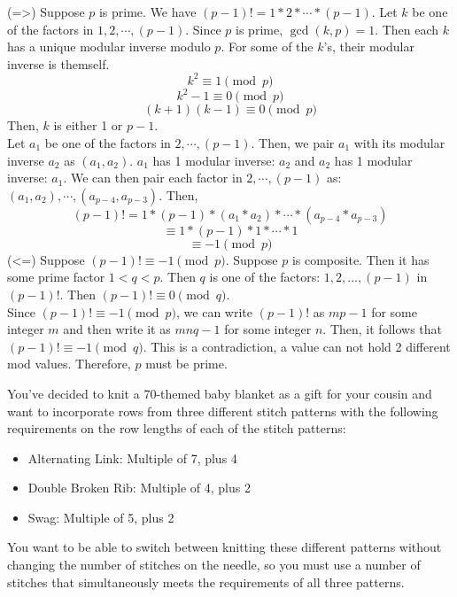 \documentclass[11pt]{article}
\begin{document}
\begin{solution}\begin{Parts}\Part 
(=>) Suppose $p$ is prime.
We have $(p-1)!=1*2*\cdots*(p-1)$.
Let $k$ be one of the factors in $1,2,\cdots,(p-1)$.
Since $p$ is prime, $\gcd(k,p)=1$.
Then each $k$ has a unique modular inverse modulo $p$.
For some of the $k$'s, their modular inverse is themself.
$$k^2\equiv1\pmod{p}$$
$$k^2-1\equiv0\pmod{p}$$
$$(k+1)(k-1)\equiv0\pmod{p}$$
Then, $k$ is either 1 or $p-1$.
\\Let $a_1$ be one of the factors in $2,\cdots,(p-1)$.
Then, we pair $a_1$ with its modular inverse $a_2$ as $(a_1,a_2)$.
$a_1$ has 1 modular inverse: $a_2$ and $a_2$ has 1 modular inverse: $a_1$.
We can then pair each factor in $2,\cdots,(p-1)$ as:
$(a_1,a_2),\cdots,(a_{p-4},a_{p-3})$.
Then, $$(p-1)!=1*(p-1)*(a_1*a_2)*\cdots*(a_{p-4}*a_{p-3})$$
$$\equiv 1*(p-1)*1*\cdots*1$$
$$\equiv-1\pmod{p}$$
\Part (<=) Suppose $(p-1)!\equiv-1\pmod{p}$.
Suppose $p$ is composite. 
Then it has some prime factor $1<q<p$.
Then $q$ is one of the factors: $1,2,\dots,(p-1)$ in $(p-1)!$.
Then $(p-1)!\equiv0\pmod{q}$.
\\Since $(p-1)!\equiv-1\pmod{p}$,
we can write $(p-1)!$ as $mp-1$ for some integer $m$
and then write it as $mnq-1$ for some integer $n$.
Then, it follows that $(p-1)!\equiv-1\pmod{q}$. 
This is a contradiction, a value can not hold 2 different mod values.
Therefore, $p$ must be prime.
\end{Parts}\end{solution}\newpage

You've decided to knit a 70-themed baby blanket as a gift for your cousin and
want to incorporate rows from three different stitch patterns with the
following requirements on the row lengths of each of the stitch patterns:
\begin{itemize}
\item Alternating Link: Multiple of 7, plus 4
\item Double Broken Rib: Multiple of 4, plus 2
\item Swag: Multiple of 5, plus 2
\end{itemize}

You want to be able to switch between knitting these different
patterns without changing the number of stitches on the needle, so you
must use a number of stitches that simultaneously meets the requirements of all three
patterns.
\end{document}
